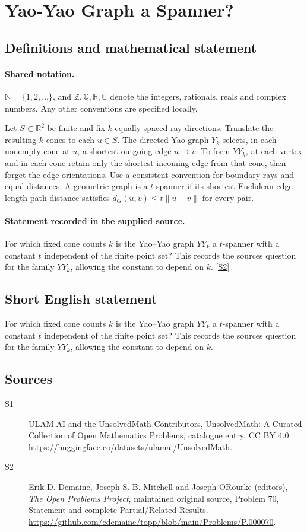 \documentclass[11pt]{article}
\newcommand{\sref}[2]{\hyperlink{source:#1:#2}{[S#2]}}
\begin{document}
\section{Yao-Yao Graph a Spanner?}\label{statement}

\subsection{Definitions and mathematical statement}

\paragraph{Shared notation.}$\mathbb N=\{1,2,\ldots\}$, and $\mathbb Z,\mathbb Q,\mathbb R,\mathbb C$ denote the integers, rationals, reals and complex numbers. Any other conventions are specified locally.


Let $S\subset\mathbb R^2$ be finite and fix $k$ equally spaced ray directions. Translate the resulting $k$ cones to each $u\in S$. The directed Yao graph $Y_k$ selects, in each nonempty cone at $u$, a shortest outgoing edge $u\to v$. To form $YY_k$, at each vertex and in each cone retain only the shortest incoming edge from that cone, then forget the edge orientations. Use a consistent convention for boundary rays and equal distances. A geometric graph is a $t$-spanner if its shortest Euclidean-edge-length path distance satisfies $d_G(u,v)\le t\lVert u-v\rVert$ for every pair.
\paragraph{Statement recorded in the supplied source.}
For which fixed cone counts $k$ is the Yao--Yao graph $YY_k$ a $t$-spanner with a constant $t$ independent of the finite point set? This records the source\textquotesingle s question for the family $YY_k$, allowing the constant to depend on $k$. \sref{statement}{2}
\subsection{Short English statement}
For which fixed cone counts $k$ is the Yao--Yao graph $YY_k$ a $t$-spanner with a constant $t$ independent of the finite point set? This records the source\textquotesingle s question for the family $YY_k$, allowing the constant to depend on $k$.
\subsection{Sources}
\begin{description}
\item[\hypertarget{source:statement:1}{S1}] ULAM.AI and the UnsolvedMath Contributors, UnsolvedMath: A Curated Collection of Open Mathematics Problems, catalogue entry. CC BY 4.0. \url{https://huggingface.co/datasets/ulamai/UnsolvedMath}.
\item[\hypertarget{source:statement:2}{S2}] Erik D. Demaine, Joseph S. B. Mitchell and Joseph O\textquotesingle Rourke (editors), \emph{The Open Problems Project}, maintained original source, Problem 70, Statement and complete Partial/Related Results. \url{https://github.com/edemaine/topp/blob/main/Problems/P.000070}.
\end{description}
\label{end:statement}
\end{document}
